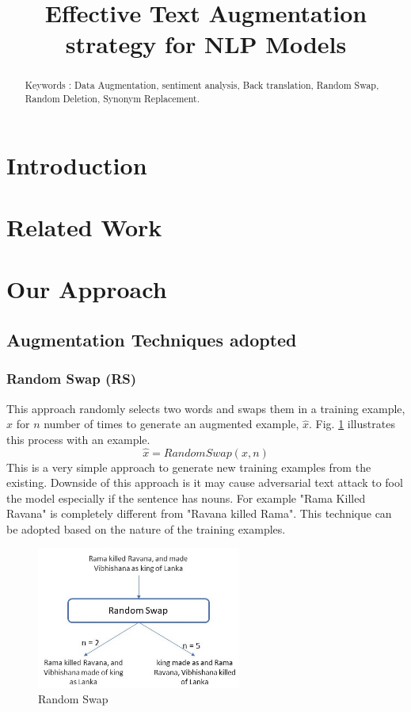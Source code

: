 \documentclass{article}
\title{Effective Text Augmentation strategy for NLP Models}
\begin{document}
\maketitle

\begin{abstract}


Keywords :  Data Augmentation, sentiment analysis, Back translation, Random Swap, Random Deletion, Synonym Replacement.


\end{abstract}

 

\section{Introduction}
\section{Related Work}
\section{Our Approach}
\subsection{Augmentation Techniques adopted}

\subsubsection{Random Swap (RS)}
This approach randomly selects two words and swaps them in a training example, $x$ for $n$ number of times to generate an augmented example, $\hat{x}$. Fig. \ref{fig:randomswap} illustrates this process with an example. 
\begin{equation}
\hat{x} = RandomSwap(x, n)
\end{equation}
This is a very simple approach to generate new training examples from the existing. Downside of this approach is it may cause adversarial text attack to fool the model especially if the sentence has nouns. For example "Rama Killed Ravana" is completely different from "Ravana killed Rama". This technique can be adopted based on the nature of the training examples.

\begin{figure}[h!]
\centering
  \includegraphics[width=0.6\textwidth]{randomswap.jpg}
  \caption{Random Swap}
  \label{fig:randomswap}
\end{figure}
\end{document}
